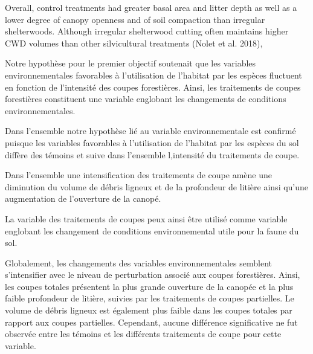 Overall, control treatments had greater basal area and litter depth as well as a lower degree of canopy openness and of soil compaction than irregular shelterwoods. 
Although irregular shelterwood cutting often maintains higher CWD volumes than other silvicultural treatments (Nolet et al. 2018),


Notre hypothèse pour le premier objectif soutenait que les variables environnementales favorables à l'utilisation de l'habitat par les espèces fluctuent 
en fonction de l'intensité des coupes forestières. 
Ainsi, les traitements de coupes forestières constituent une variable englobant les changements de conditions environnementales.


Dans l'ensemble notre hypothèse lié au variable environnementale est confirmé puisque les variables favorables à l'utilisation de l'habitat par les espèces du sol 
diffère des témoins et suive dans l'ensemble l,intensité du traitements de coupe.

Dans l'ensemble une intensification des traitements de coupe amène une diminution du volume de débris ligneux et de la profondeur de litière ainsi qu'une augmentation de l'ouverture de la canopé.

La variable des traitements de coupes peux ainsi être utilisé comme variable englobant les changement de conditions environnemental utile pour la faune du sol. 



Globalement, les changements des variables environnementales semblent s'intensifier avec le niveau de perturbation associé aux coupes forestières. 
Ainsi, les coupes totales présentent la plus grande ouverture de la canopée et la plus faible profondeur de litière, suivies par les traitements de coupes partielles. 
Le volume de débris ligneux est également plus faible dans les coupes totales par rapport aux coupes partielles. 
Cependant, aucune différence significative ne fut observée entre les témoins et les différents traitements de coupe pour cette variable.



